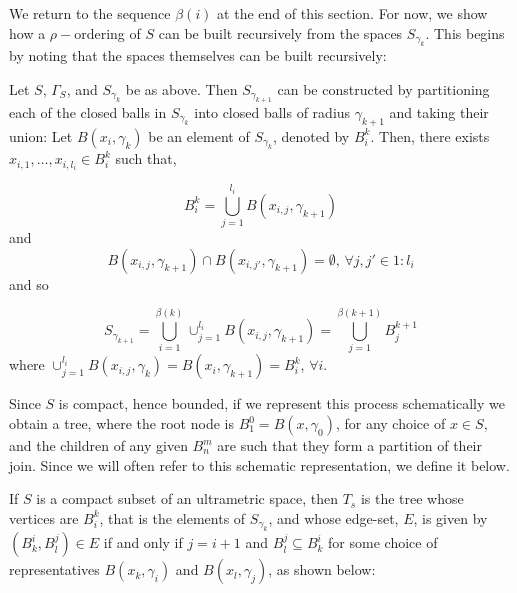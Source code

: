 We return to the sequence $\beta(i)$ at the end of this section. For now, we show how a $\rho-$ordering of $S$ can be built recursively from the spaces $S_{\gamma_k}$. This begins by noting that the spaces themselves can be built recursively:\\

\begin{observation}
Let $S$, $\Gamma_S$, and $S_{\gamma_k}$ be as above. Then $S_{\gamma_{k+1}}$ can be constructed by partitioning each of the closed balls in $S_{\gamma_k}$ into closed balls of radius $\gamma_{k+1}$ and taking their union:  Let $B(x_i, \gamma_k)$  be an element of $S_{\gamma_k}$, denoted by  $B^k_i$. Then, there exists $x_{i,1},\ldots, x_{i,l_{i}} \in B^k_i$ such that,

\[B^k_i=  \bigcup_{j=1}^{l_i} B(x_{i,j}, \gamma_{k+1})\] and  \[B(x_{i,j}, \gamma_{k+1}) \cap B(x_{i,j'}, \gamma_{k+1}) = \emptyset \text{, }\forall j,j' \in 1:l_i\]
and so

\[S_{\gamma_{k+1}} =  \bigcup_{i=1}^{\beta(k)}   \cup_{j=1}^{l_i} B(x_{i,j}, \gamma_{k+1}) = \bigcup^{\beta(k+1)}_{j=1}B^{k+1}_{j}\] 
where $\cup_{j=1}^{l_i} B(x_{i,j},\gamma_{k})=B(x_i, \gamma_{k+1}) = B^k_i$, $\forall i$.
\end{observation}

Since $S$ is compact, hence bounded, if we represent this process schematically we obtain a tree, where the root node is $B^0_1=B(x,\gamma_0)$, for any choice of $x \in S$, and the children of any given $B^m_n$ are such that they form a partition of their join.  Since we will often refer to this schematic representation, we define it below.\\

\begin{definition}
If $S$ is a compact subset of an ultrametric space, then $T_s$ is the tree whose vertices are $B^k_i$, that is the elements of $S_{\gamma_k}$, and whose edge-set, $E$, is given by $ (B^i_k, B^j_l) \in E$ if and only if $ j = i+1$ and $B^j_l \subseteq B^i_k$ for some choice of representatives $B(x_k,\gamma_i)$ and $B(x_l, \gamma_j)$, as shown below:\\

\tikzset{font=\small,
level distance=1.75cm,
}

\begin{center}
\end{center}
\end{definition}

